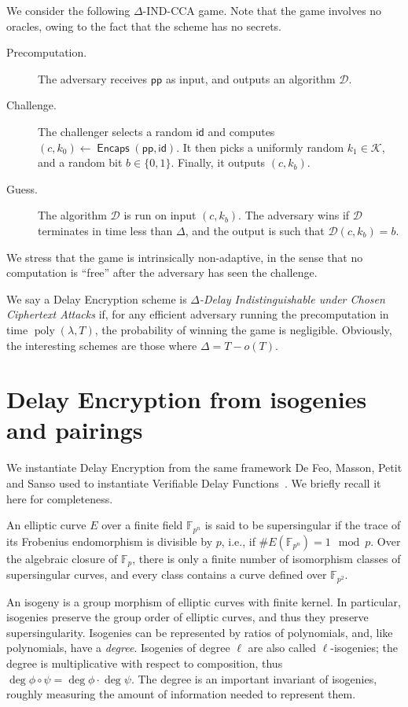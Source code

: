 \documentclass{llncs}
\newcommand{\F}{\mathbb{F}}
\DeclareMathOperator{\poly}{poly}
\DeclareMathOperator{\Encaps}{\mathsf{Encaps}}
\newcommand{\pp}{\mathsf{pp}}
\newcommand{\id}{\mathsf{id}}
\newcommand{\keyspace}{\mathcal{K}}
\begin{document}
We consider the following $\Delta$-IND-CCA game. %
Note that the game involves no oracles, owing to the fact that the
scheme has no secrets. %
%
\begin{description}
\item[Precomputation.] The adversary receives $\pp$ as input, and
  outputs an algorithm $\mathcal{D}$. %
\item[Challenge.] The challenger selects a random $\id$ and computes
  $(c,k_0)\gets\Encaps(\pp,\id)$. %
  It then picks a uniformly random $k_1\in\keyspace$, and a random bit
  $b\in\{0,1\}$. %
  Finally, it outputs $(c,k_b)$.
\item[Guess.] The algorithm $\mathcal{D}$ is run on input
  $(c,k_b)$. %
  The adversary wins if $\mathcal{D}$ terminates in time less than
  $\Delta$, and the output is such that $\mathcal{D}(c,k_b) = b$.
\end{description}

We stress that the game is intrinsically non-adaptive, in the sense
that no computation is ``free'' after the adversary has seen the
challenge.

We say a Delay Encryption scheme is \emph{$\Delta$-Delay
  Indistinguishable under Chosen Ciphertext Attacks} if, for any
efficient adversary running the precomputation in time
$\poly(\lambda,T)$, the probability of winning the game is
negligible. %
Obviously, the interesting schemes are those where $\Delta = T-o(T)$.


\section{Delay Encryption from isogenies and pairings}
\label{sec:delay-encrypt-from}

We instantiate Delay Encryption from the same framework De Feo,
Masson, Petit and Sanso used to instantiate Verifiable Delay
Functions~\cite{10.1007/978-3-030-34578-5_10}. %
We briefly recall it here for completeness.

An elliptic curve $E$ over a finite field $\F_{p^n}$ is said to be
supersingular if the trace of its Frobenius endomorphism is divisible
by $p$, i.e., if $\#E(\F_{p^n})=1\mod p$. %
Over the algebraic closure of $\F_p$, there is only a finite number of
isomorphism classes of supersingular curves, and every class contains
a curve defined over $\F_{p^2}$.

An isogeny is a group morphism of elliptic curves with finite
kernel. %
In particular, isogenies preserve the group order of elliptic curves,
and thus they preserve supersingularity. %
Isogenies can be represented by ratios of polynomials, and, like
polynomials, have a \emph{degree}. %
Isogenies of degree $\ell$ are also called $\ell$-isogenies; the
degree is multiplicative with respect to composition, thus
$\deg\phi\circ\psi=\deg\phi\cdot\deg\psi$. %
The degree is an important invariant of isogenies, roughly measuring
the amount of information needed to represent them.
\end{document}
